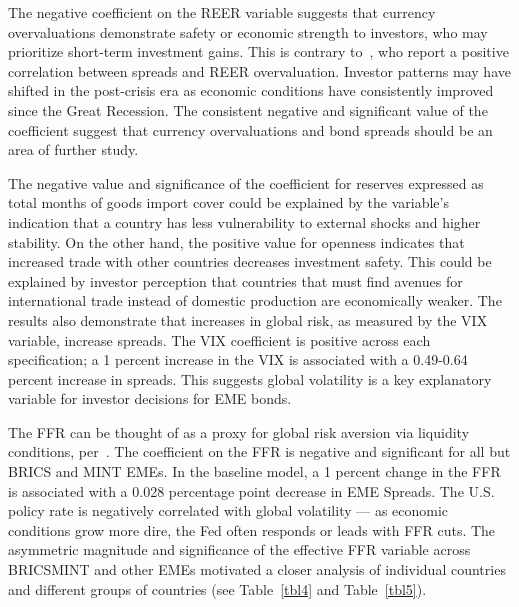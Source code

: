 \documentclass[12pt]{article}
\begin{document}
The negative coefficient on the REER variable suggests that currency overvaluations demonstrate safety or economic strength to investors, who may prioritize short-term investment gains. This is contrary to~\textcite{jahjah13}, who report a positive correlation between spreads and REER overvaluation. Investor patterns may have shifted in the post-crisis era as economic conditions have consistently improved since the Great Recession. The consistent negative and significant value of the coefficient suggest that currency overvaluations and bond spreads should be an area of further study.

The negative value and significance of the coefficient for reserves expressed as total months of goods import cover could be explained by the variable's indication that a country has less vulnerability to external shocks and higher stability. On the other hand, the positive value for openness indicates that increased trade with other countries decreases investment safety. This could be explained by investor perception that countries that must find avenues for international trade instead of domestic production are economically weaker. The results also demonstrate that increases in global risk, as measured by the VIX variable, increase spreads. The VIX coefficient is positive across each specification; a 1 percent increase in the VIX is associated with a 0.49-0.64 percent increase in spreads. This suggests global volatility is a key explanatory variable for investor decisions for EME bonds.

The FFR can be thought of as a proxy for global risk aversion via liquidity conditions, per~\textcite{csonto13}. The coefficient on the FFR is negative and significant for all but BRICS and MINT EMEs. In the baseline model, a 1 percent change in the FFR is associated with a 0.028 percentage point decrease in EME Spreads. The U.S. policy rate is negatively correlated with global volatility --- as economic conditions grow more dire, the Fed often responds or leads with FFR cuts. The asymmetric magnitude and significance of the effective FFR variable across BRICSMINT and other EMEs motivated a closer analysis of individual countries and different groups of countries (see Table~\ref{tbl4} and Table~\ref{tbl5}).
\end{document}
